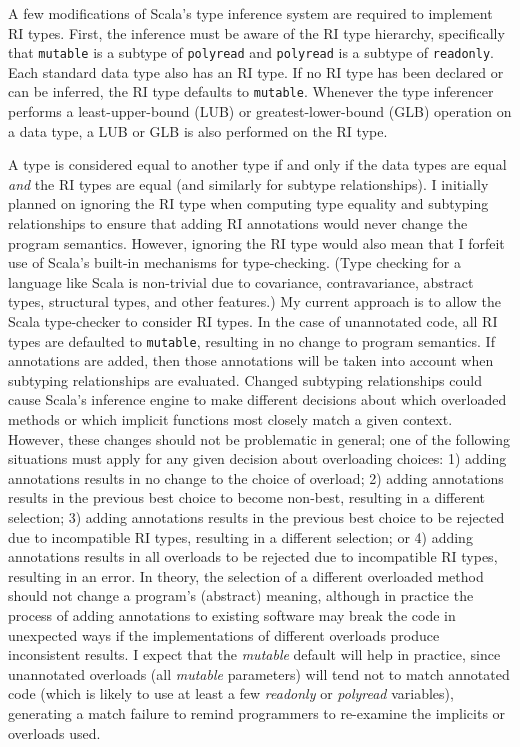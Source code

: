 \documentclass[letterpaper,11pt]{article}
\newcommand{\code}[1]{\lstinline$#1$}
\theoremstyle{definition}
\theoremstyle{remark}
\begin{document}
A few modifications of Scala's type inference system are required to implement
RI types.
First, the inference must be aware of the RI type hierarchy,
specifically that \code{mutable} is a subtype of \code{polyread} and
\code{polyread} is a subtype of \code{readonly}.
Each standard data type also has an RI type.
If no RI type has been declared or can be inferred, the RI type defaults to \code{mutable}.
Whenever the type inferencer performs a least-upper-bound (LUB) or
greatest-lower-bound (GLB) operation on a data type, a LUB or GLB is also performed
on the RI type.

A type is considered equal to another type if and only if
the data types are equal \emph{and} the RI types are equal
(and similarly for subtype relationships).
I initially planned on ignoring the RI type when computing type equality
and subtyping relationships to ensure that adding RI annotations would never change
the program semantics. However, ignoring the RI type would also mean that I forfeit
use of Scala's built-in mechanisms for type-checking.
(Type checking for a language like Scala is non-trivial due to covariance,
contravariance, abstract types, structural types, and other features.)
My current approach is to allow the Scala type-checker to consider
RI types. In the case of unannotated code, all RI types are defaulted to
\code{mutable}, resulting in no change to program semantics.
If annotations are added, then those annotations will be taken into account
when subtyping relationships are evaluated.
Changed subtyping relationships could cause Scala's inference engine
to make different decisions about which overloaded methods or which
implicit functions most closely match a given context.
However, these changes should not be problematic in general;
one of the following situations must apply for any given decision about overloading choices:
1) adding annotations results in no change to the choice of overload;
2) adding annotations results in the previous best choice to become non-best,
	resulting in a different selection;
3) adding annotations results in the previous best choice to be rejected due
to incompatible RI types, resulting in a different selection; or
4) adding annotations results in all overloads to be rejected due to incompatible RI types,
	resulting in an error.
In theory, the selection of a different overloaded method should not change
a program's (abstract) meaning,
although in practice the process of adding annotations to existing software
may break the code in unexpected ways if
the implementations of different overloads produce inconsistent results.
I expect that the \emph{mutable} default will help in practice,
since unannotated overloads (all \emph{mutable} parameters) will tend not to match annotated code
(which is likely to use at least a few \emph{readonly} or \emph{polyread} variables),
generating a match failure to remind programmers to re-examine the implicits or overloads used.
\end{document}
